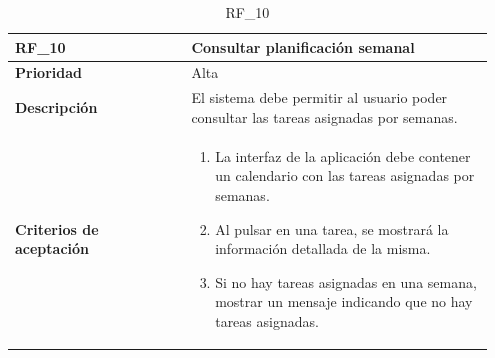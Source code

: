 \begin{table}[htb!]
    \begin{tabular}{|p{0.35\linewidth}|p{0.6\linewidth}|}
        \hline
        \rowcolor[HTML]{C0C0C0}  
        \textbf{RF\_10} & \textbf{Consultar planificación semanal} \\
        \hline
        \textbf{Prioridad} & Alta \\
        \hline
        \textbf{Descripción} & El sistema debe permitir al usuario poder consultar las tareas asignadas por semanas.  \\
        \hline
        \vspace{0.5mm}
        \textbf{Criterios de aceptación} & 
        \begin{minipage}[t]{0.9\linewidth}
            \begin{enumerate}
                \item La interfaz de la aplicación debe contener un calendario con las tareas asignadas por semanas.
                \item Al pulsar en una tarea, se mostrará la información detallada de la misma.
                \item Si no hay tareas asignadas en una semana, mostrar un mensaje indicando que no hay tareas asignadas.
            \end{enumerate}
            \vspace{2mm}
        \end{minipage} \\
        \hline
    \end{tabular}
    \caption{RF\_10}

\end{table}


